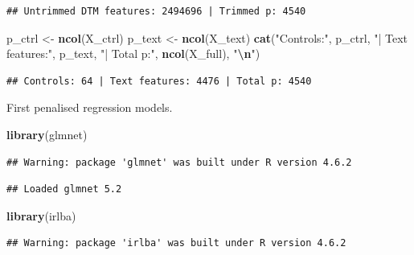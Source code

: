 \documentclass[
]{article}
\newenvironment{Shaded}{\begin{snugshade}}{\end{snugshade}}
\newcommand{\FunctionTok}[1]{\textcolor[rgb]{0.13,0.29,0.53}{\textbf{#1}}}
\newcommand{\NormalTok}[1]{#1}
\newcommand{\OtherTok}[1]{\textcolor[rgb]{0.56,0.35,0.01}{#1}}
\newcommand{\SpecialCharTok}[1]{\textcolor[rgb]{0.81,0.36,0.00}{\textbf{#1}}}
\newcommand{\StringTok}[1]{\textcolor[rgb]{0.31,0.60,0.02}{#1}}
\begin{document}
\begin{verbatim}
## Untrimmed DTM features: 2494696 | Trimmed p: 4540
\end{verbatim}

\begin{Shaded}
\begin{Highlighting}[]
\NormalTok{p\_ctrl }\OtherTok{\textless{}{-}} \FunctionTok{ncol}\NormalTok{(X\_ctrl)}
\NormalTok{p\_text }\OtherTok{\textless{}{-}} \FunctionTok{ncol}\NormalTok{(X\_text)}
\FunctionTok{cat}\NormalTok{(}\StringTok{"Controls:"}\NormalTok{, p\_ctrl, }\StringTok{"| Text features:"}\NormalTok{, p\_text, }\StringTok{"| Total p:"}\NormalTok{, }\FunctionTok{ncol}\NormalTok{(X\_full), }\StringTok{"}\SpecialCharTok{\textbackslash{}n}\StringTok{"}\NormalTok{)}
\end{Highlighting}
\end{Shaded}

\begin{verbatim}
## Controls: 64 | Text features: 4476 | Total p: 4540
\end{verbatim}

First penalised regression models.

\begin{Shaded}
\begin{Highlighting}[]
\FunctionTok{library}\NormalTok{(glmnet)}
\end{Highlighting}
\end{Shaded}

\begin{verbatim}
## Warning: package 'glmnet' was built under R version 4.6.2
\end{verbatim}

\begin{verbatim}
## Loaded glmnet 5.2
\end{verbatim}

\begin{Shaded}
\begin{Highlighting}[]
\FunctionTok{library}\NormalTok{(irlba)}
\end{Highlighting}
\end{Shaded}

\begin{verbatim}
## Warning: package 'irlba' was built under R version 4.6.2
\end{verbatim}
\end{document}
